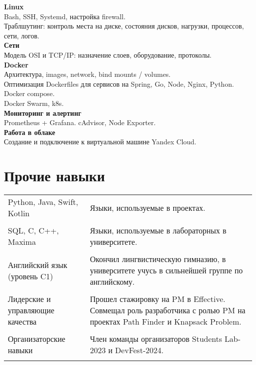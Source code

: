 \documentclass[a4paper,12pt]{article}
\begin{document}
\textbf{Linux}\\
Bash, SSH, Systemd, настройка firewall.\\
Траблшутинг: контроль места на диске, состояния дисков, нагрузки, процессов, сети, логов.\\

\textbf{Сети} \\
Модель OSI и TCP/IP: назначение слоев, оборудование, протоколы.\\

\textbf{Docker} \\
Архитектура, images, network, bind mounts / volumes. \\
Оптимизация Dockerfiles для сервисов на Spring, Go, Node, Nginx, Python.\\
Docker compose. \\
Docker Swarm, k8s.\\ 

\textbf{Мониторинг и алертинг}\\
Prometheus + Grafana. cAdvisor, Node Exporter.\\

\textbf{Работа в облаке}\\
Создание и подключение к виртуальной машине Yandex Cloud.\\

\section{Прочие навыки}

\begin{tabularx}{\linewidth}{@{}l X@{}}
Python, Java, Swift, Kotlin &  \normalsize{Языки, используемые в проектах.}\\\\

SQL, C, C++, Maxima &  \normalsize{Языки, используемые в лабораторных в университете.}\\\\

Английский язык (уровень C1) &  \normalsize{Окончил лингвистическую гимназию, в университете учусь в сильнейшей группе по английскому.}\\\\

Лидерские и управляющие качества  &  \normalsize {Прошел стажировку на PM в Effective. Совмещал роль разработчика с ролью PM на проектах Path Finder и Knapsack Problem.}\\ \\

Организаторские навыки  &  \normalsize {Член команды организаторов Students Lab-2023 и DevFest-2024.}\\ \\

\end{tabularx}

\vfill
{}
\end{document}
